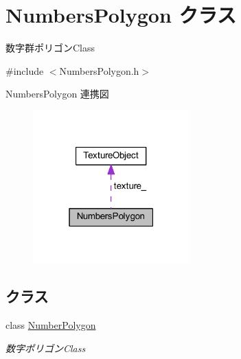 \hypertarget{class_numbers_polygon}{}\section{Numbers\+Polygon クラス}
\label{class_numbers_polygon}


数字群ポリゴン\+Class  




{\ttfamily \#include $<$Numbers\+Polygon.\+h$>$}



Numbers\+Polygon 連携図\nopagebreak
\begin{figure}[H]
\begin{center}
\leavevmode
\includegraphics[width=171pt]{class_numbers_polygon__coll__graph}
\end{center}
\end{figure}
\subsection*{クラス}
\begin{DoxyCompactItemize}
\item 
class \mbox{\hyperlink{class_numbers_polygon_1_1_number_polygon}{Number\+Polygon}}
\begin{DoxyCompactList}\small\item\em 数字ポリゴン\+Class \end{DoxyCompactList}\end{DoxyCompactItemize}
